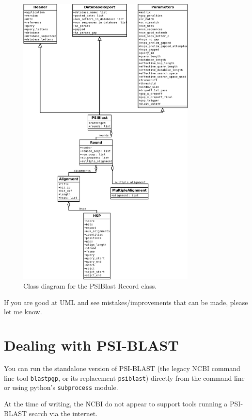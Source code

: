 \begin{latexonly}
\begin{figure}[htbp]
\centering
\includegraphics[width=0.8\textwidth]{images/PSIBlastRecord.png}
\caption{Class diagram for the PSIBlast Record class.}
\label{fig:psiblastrecord}
\end{figure}
\end{latexonly}

If you are good at UML and see mistakes/improvements that can be made, please let me know.

\section{Dealing with PSI-BLAST}

You can run the standalone version of PSI-BLAST (the legacy NCBI command line
tool \verb|blastpgp|, or its replacement \verb|psiblast|) directly from the
command line or using python's \verb|subprocess| module.

At the time of writing, the NCBI do not appear to support tools running a
PSI-BLAST search via the internet.

